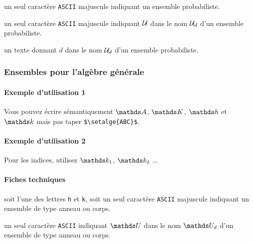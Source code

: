 \documentclass[12pt,a4paper]{article}
\theoremstyle{definition}
\newcommand\ascii{\texttt{ASCII}}
\begin{document}

\IDarg{} un seul caractère \ascii{} majuscule indiquant un ensemble probabiliste.


\bigskip



 un seul caractère \ascii{} majuscule indiquant $\setproba{U}$ dans le nom $\setproba*{U}{d}$ d'un ensemble probabiliste.

 un texte donnant $d$ dans le nom $\setproba*{U}{d}$ d'un ensemble probabiliste.



\subsubsection{Ensembles pour l'algèbre générale}

\paragraph{Exemple d'utilisation 1}

\begin{tcblisting}{}
Vous pouvez écrire sémantiquement $\setalge{A}$, $\setalge{K}$, $\setalge{h}$ et
$\setalge{k}$ mais pas taper \verb+$\setalge{ABC}$+.
\end{tcblisting}


\paragraph{Exemple d'utilisation 2}

\begin{tcblisting}{}
Pour les indices, utilisez $\setalge*{k}{1}$, $\setalge*{k}{2}$ \dots
\end{tcblisting}


\paragraph{Fiches techniques}


\IDarg{} soit l'une des lettres  \texttt{h} et \texttt{k}, soit un seul caractère \ascii{} majuscule indiquant un ensemble de type anneau ou corps.


\bigskip



 un seul caractère \ascii{} indiquant $\setalge{U}$ dans le nom $\setalge*{U}{d}$ d'un ensemble de type anneau ou corps.
\end{document}
